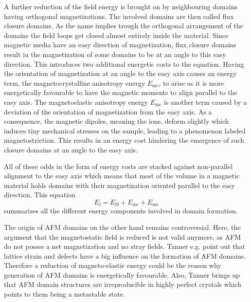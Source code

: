 A further reduction of the field energy is brought on by neighbouring domains having orthogonal magnetizations.
The involved domains are then called flux closure domains.
As the name implies trough the orthogonal arrangement of the domains the field loops get closed almost entirely inside the material.
Since magnetic media have an easy direction of magnetization, flux closure domains result in the magnetization of some domains to be at an angle to this easy direction.
This introduces two additional energetic costs to the equation.
Having the orientation of magnetization at an angle to the easy axis causes an energy term, the magnetocrystalline anisotropy energy $E_{\text{mc}}$, to arise as it is more energetically favourable to have the magnetic moments to align parallel to the easy axis.
The magnetoelastic anisotropy energy $E_{\text{me}}$ is another term caused by a deviation of the orientation of magnetization from the easy axis.
As a consequence, the magnetic dipoles, meaning the ions, deform slightly which induces tiny mechanical stresses on the sample, leading to a phenomenon labeled magnetostriction.
This results in an energy cost hindering the emergence of such closure domains at an angle to the easy axis.

All of these odds in the form of energy costs are stacked against non-parallel alignment to the easy axis which means that most of the volume in a magnetic material holds domains with their magnetization oriented parallel to the easy direction.
This equation
\begin{equation}
    E_{\text{f}} = E_{\text{D}} + E_{\text{mc}} + E_{\text{me}}
    \label{eqn:landau_lifschitz_energy}
\end{equation}
summarizes all the different energy components involved in domain formation.

The origin of AFM domains on the other hand remains controversial.
Here, the argument that the magnetostatic field is reduced is not valid anymore, as AFM do not posses a net magnetization and no stray fields. 
Tanner e.g. point out that lattice strain and defects have a big influence on the formation of AFM domains.
Therefore a reduction of magneto-elastic energy could be the reason why generation of AFM domains is energetically favourable.
Also, Tanner brings up that AFM domain structures are irreproducible in highly perfect crystals which points to them being a metastable state.


